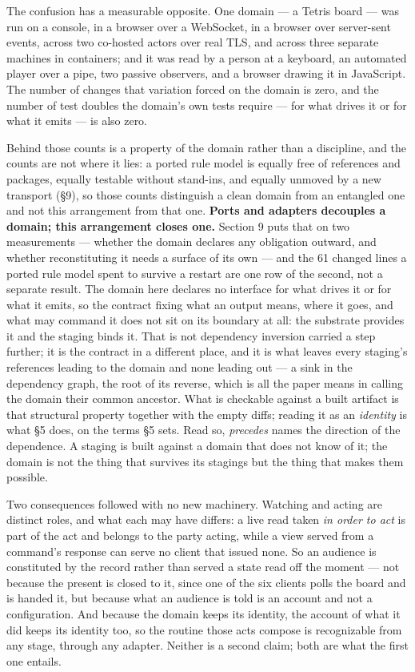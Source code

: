 \documentclass[
]{article}
\newcounter{none} %
\begin{document}
The confusion has a measurable opposite. One domain --- a Tetris board
--- was run on a console, in a browser over a WebSocket, in a browser
over server-sent events, across two co-hosted actors over real TLS, and
across three separate machines in containers; and it was read by a
person at a keyboard, an automated player over a pipe, two passive
observers, and a browser drawing it in JavaScript. The number of changes
that variation forced on the domain is zero, and the number of test
doubles the domain's own tests require --- for what drives it or for
what it emits --- is also zero.

Behind those counts is a property of the domain rather than a
discipline, and the counts are not where it lies: a ported rule model is
equally free of references and packages, equally testable without
stand-ins, and equally unmoved by a new transport (§9), so those counts
distinguish a clean domain from an entangled one and not this
arrangement from that one. \textbf{Ports and adapters decouples a
domain; this arrangement closes one.} Section 9 puts that on two
measurements --- whether the domain declares any obligation outward, and
whether reconstituting it needs a surface of its own --- and the 61
changed lines a ported rule model spent to survive a restart are one row
of the second, not a separate result. The domain here declares no
interface for what drives it or for what it emits, so the contract
fixing what an output means, where it goes, and what may command it does
not sit on its boundary at all: the substrate provides it and the
staging binds it. That is not dependency inversion carried a step
further; it is the contract in a different place, and it is what leaves
every staging's references leading to the domain and none leading out
--- a sink in the dependency graph, the root of its reverse, which is
all the paper means in calling the domain their common ancestor. What is
checkable against a built artifact is that structural property together
with the empty diffs; reading it as an \emph{identity} is what §5 does,
on the terms §5 sets. Read so, \emph{precedes} names the direction of
the dependence. A staging is built against a domain that does not know
of it; the domain is not the thing that survives its stagings but the
thing that makes them possible.

Two consequences followed with no new machinery. Watching and acting are
distinct roles, and what each may have differs: a live read taken
\emph{in order to act} is part of the act and belongs to the party
acting, while a view served from a command's response can serve no
client that issued none. So an audience is constituted by the record
rather than served a state read off the moment --- not because the
present is closed to it, since one of the six clients polls the board
and is handed it, but because what an audience is told is an account and
not a configuration. And because the domain keeps its identity, the
account of what it did keeps its identity too, so the routine those acts
compose is recognizable from any stage, through any adapter. Neither is
a second claim; both are what the first one entails.
\end{document}
